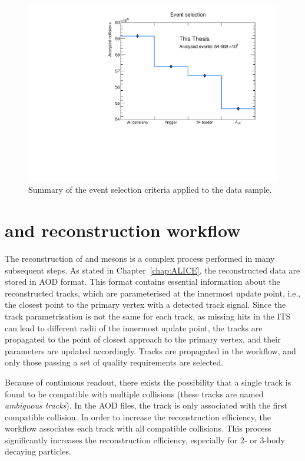 \begin{figure}[htb]
    \centering
    \includegraphics[width=0.7\linewidth]{Figures/Chapter 4/EventSelection.pdf}
    \caption{Summary of the event selection criteria applied to the data sample.}
    \label{fig:EvSel}
\end{figure}

\section{\texorpdfstring{\ds and \dpl reconstruction workflow}{Ds+ and D+ reconstruction workflow}}
The reconstruction of \ds and \dpl mesons is a complex process performed in many subsequent steps. As stated in Chapter~\ref{chap:ALICE}, the reconstructed data are stored in AOD format. This format contains essential information about the reconstructed tracks, which are parameterised at the innermost update point, i.e., the closest point to the primary vertex with a detected track signal. Since the track parametrisation is not the same for each track, as missing hits in the ITS can lead to different radii of the innermost update point, the tracks are propagated to the point of closest approach to the primary vertex, and their parameters are updated accordingly. Tracks are propagated in the  workflow, and only those passing a set of quality requirements are selected. 

Because of continuous readout, there exists the possibility that a single track is found to be compatible with multiple collisions (these tracks are named \emph{ambiguous tracks}). In the AOD files, the track is only associated with the first compatible collision. In order to increase the reconstruction efficiency, the  workflow associates each track with all compatible collisions. This process significantly increases the reconstruction efficiency, especially for 2- or 3-body decaying particles.

